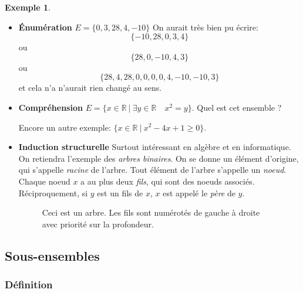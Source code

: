 \documentclass[11pt]{article}
\newcommand{\R}{\mathbb R}
\theoremstyle{definition}
\newtheorem{exe}{Exemple}
\theoremstyle{remark}
\begin{document}
\begin{exe}\leavevmode
\begin{itemize}
\item \textbf{Énumération} $E=\{0,3,28,4,-10\}$
On aurait très bien pu écrire:
\[ \{-10,28,0,3,4\} \]
ou
\[ \{28,0,-10,4,3\} \]
ou
\[ \{28,4,28,0,0,0,0,4,-10,-10,3\} \]
et cela n'a n'aurait rien changé au sens. 

\item \textbf{Compréhension} $E = \{x\in\R\ |\ \exists y\in\R\quad x^2=y \}$. Quel est cet ensemble ?

Encore un autre exemple: $\{x\in\R\ |\ x^2-4x+1 \geq 0\}$.
\item \textbf{Induction structurelle} Surtout intéressant en algèbre et en informatique. On retiendra l'exemple des \textit{arbres binaires}. On se donne un élément d'origine, qui s'appelle \textit{racine} de l'arbre. Tout élément de l'arbre s'appelle un \textit{noeud}. Chaque noeud $x$ a au plus deux \textit{fils}, qui sont des noeuds associés. Réciproquement, si $y$ est un fils de $x$, $x$ est appelé le \textit{père} de $y$.
\begin{figure}
\centering
{}
\caption{Ceci est un arbre. Les fils sont numérotés de gauche à droite avec priorité sur la profondeur.}
\end{figure}
\end{itemize}
\end{exe}

\subsection{Sous-ensembles}

\subsubsection{Définition}
\end{document}
